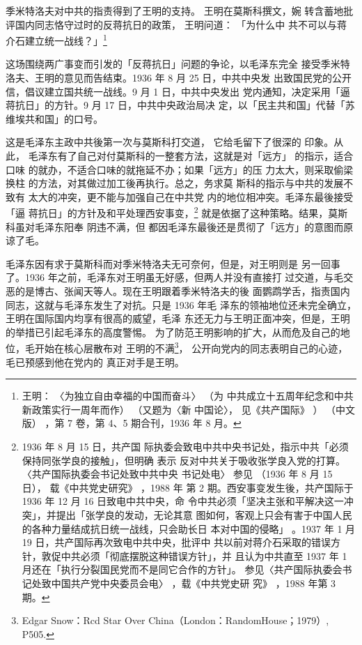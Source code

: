 季米特洛夫对中共的指责得到了王明的支持。 王明在莫斯科撰文，婉 转含蓄地批
评国内同志恪守过时的反蒋抗日的政策， 王明问道： 「为什么中 共不可以与蒋
介石建立统一战线？」\footnote{王明： 〈为独立自由幸福的中国而奋斗〉 （为
中共成立十五周年纪念和中共新政策实行一周年而作） （又题为〈新 中国论〉，
见《共产国际》 ） （中文版） ，第 7 卷，第 4、5 期合刊，1936 年 8 月。} 

这场围绕两广事变而引发的「反蒋抗日」问题的争论，以毛泽东完全
接受季米特洛夫、王明的意见而告结束。1936 年 8 月 25 日，中共中央发
出致国民党的公开信，倡议建立国共统一战线。9 月 1 日，中共中央发出
党内通知，决定采用「逼蒋抗日」的方针。9 月 17 日，中共中央政治局决
定，以「民主共和国」代替「苏维埃共和国」的口号。

这是毛泽东主政中共後第一次与莫斯科打交道， 它给毛留下了很深的 印象。从此，
毛泽东有了自己对付莫斯科的一整套方法，这就是对「远方」 的指示，适合口味
的就办，不适合口味的就拖延不办；如果「远方」的压 力太大，则采取偷梁换柱
的方法，对其做过加工後再执行。总之，务求莫 斯科的指示与中共的发展不致有
太大的冲突，更不能与加强自己在中共党 内的地位相冲突。毛泽东最後接受「逼
蒋抗日」的方针及和平处理西安事变，\footnote{ 1936 年 8 月 15 日，共产国
际执委会致电中共中央书记处，指示中共「必须保持同张学良的接触」，但明确
表示 反对中共关于吸收张学良入党的打算。 〈共产国际执委会书记处致中共中央
书记处电〉 参见 （1936 年 8 月 15 日）， 载《中共党史研究》 ，1988 年
第 2 期。西安事变发生後，共产国际于 1936 年 12 月 16 日致电中共中央，命
令中共必须「坚决主张和平解决这一冲突」，并提出「张学良的发动，无论其意
图如何，客观上只会有害于中国人民的各种力量结成抗日统一战线，只会助长日
本对中国的侵略」 。1937 年 1 月 19 日，共产国际再次致电中共中央，批评中
共以前对蒋介石采取的错误方针，敦促中共必须「彻底摆脱这种错误方针」，并
且认为中共直至 1937 年 1 月还在「执行分裂国民党而不是同它合作的方针」。
参见〈共产国际执委会书记处致中国共产党中央委员会电〉 ，载《中共党史研
究》 ，1988 年第 3 期。} 就是依据了这种策略。结果，莫斯科虽对毛泽东阳奉
阴违不满，但 都因毛泽东最後还是贯彻了「远方」的意图而原谅了毛。

毛泽东因有求于莫斯科而对季米特洛夫无可奈何，但是，对王明则是
另一回事了。1936 年之前，毛泽东对王明虽无好感，但两人并没有直接打
过交道，与毛交恶的是博古、张闻天等人。现在王明跟着季米特洛夫的後
面鹦鹉学舌，指责国内同志，这就与毛泽东发生了对抗。只是 1936 年毛
泽东的领袖地位还未完全确立，王明在国际国内均享有很高的威望，毛泽
东还无力与王明正面冲突，但是，王明的举措已引起毛泽东的高度警惕。
为了防范王明影响的扩大，从而危及自己的地位，毛开始在核心层散布对
王明的不满\footnote{Edgar Snow：Rcd Star
Over China（London：RandomHouse；1979）, P505.}， 公开向党内的同志表明自己的心迹，
毛已预感到他在党内的
真正对手是王明。
